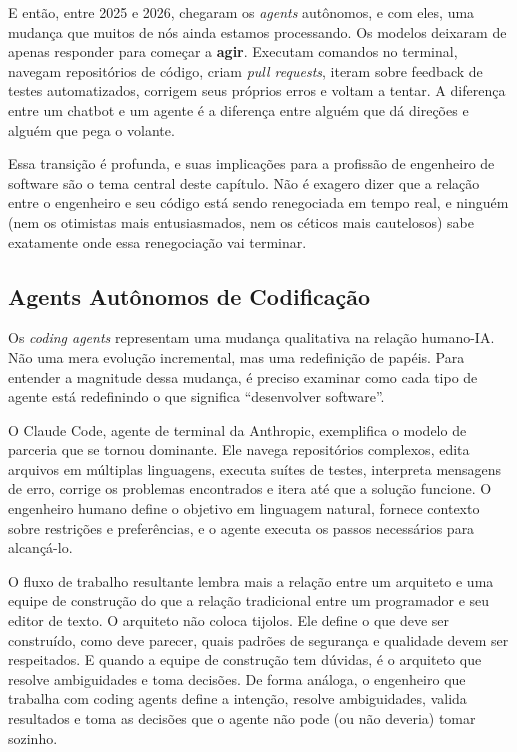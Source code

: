 E então, entre 2025 e 2026, chegaram os \textit{agents} autônomos, e
com eles, uma mudança que muitos de nós ainda estamos processando. Os
modelos deixaram de apenas responder para começar a \textbf{agir}.
Executam comandos no terminal, navegam repositórios de código, criam
\textit{pull requests}, iteram sobre feedback de testes automatizados,
corrigem seus próprios erros e voltam a tentar. A diferença entre um
chatbot e um agente é a diferença entre alguém que dá direções e alguém
que pega o volante.

Essa transição é profunda, e suas implicações para a profissão de
engenheiro de software são o tema central deste capítulo. Não é exagero
dizer que a relação entre o engenheiro e seu código está sendo
renegociada em tempo real, e ninguém (nem os otimistas mais
entusiasmados, nem os céticos mais cautelosos) sabe exatamente onde
essa renegociação vai terminar.

\subsection{Agents Autônomos de Codificação}

Os \textit{coding agents} representam uma mudança qualitativa na relação
humano-IA. Não uma mera evolução incremental, mas uma redefinição de
papéis. Para entender a magnitude dessa mudança, é preciso examinar
como cada tipo de agente está redefinindo o que significa ``desenvolver
software''.

O Claude Code, agente de terminal da Anthropic, exemplifica o modelo de
parceria que se tornou dominante. Ele navega repositórios complexos,
edita arquivos em múltiplas linguagens, executa suítes de testes,
interpreta mensagens de erro, corrige os problemas encontrados e itera
até que a solução funcione. O engenheiro humano define o objetivo em
linguagem natural, fornece contexto sobre restrições e preferências, e
o agente executa os passos necessários para alcançá-lo.

O fluxo de trabalho resultante lembra mais a relação entre um arquiteto
e uma equipe de construção do que a relação tradicional entre um
programador e seu editor de texto. O arquiteto não coloca tijolos. Ele
define o que deve ser construído, como deve parecer, quais padrões de
segurança e qualidade devem ser respeitados. E quando a equipe de
construção tem dúvidas, é o arquiteto que resolve ambiguidades e toma
decisões. De forma análoga, o engenheiro que trabalha com coding agents
define a intenção, resolve ambiguidades, valida resultados e toma as
decisões que o agente não pode (ou não deveria) tomar sozinho.

